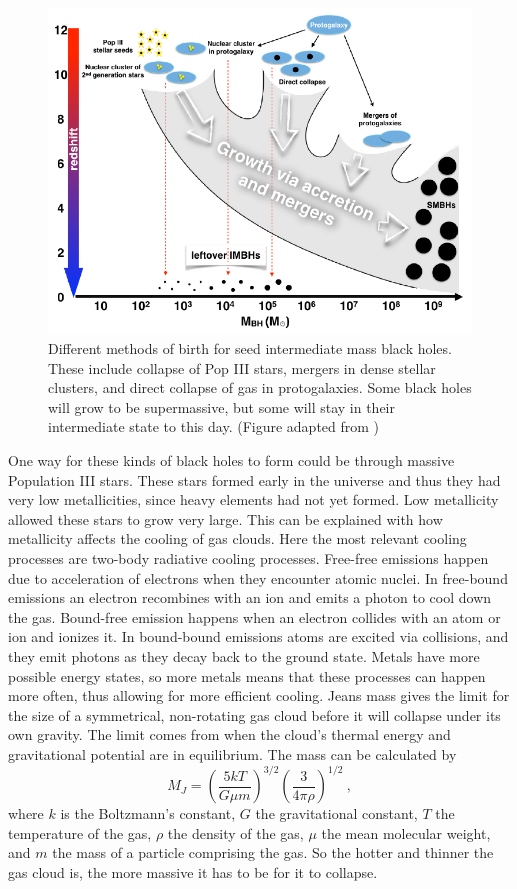\documentclass[english, oneside]{HYgradu}
\begin{document}
\begin{figure}[h!tb]
\centering
\includegraphics[width=\textwidth]{../images/imbhs.pdf}
\caption{Different methods of birth for seed intermediate mass black holes. These include collapse of Pop III stars, mergers in dense stellar clusters, and direct collapse of gas in protogalaxies. Some black holes will grow to be supermassive, but some will stay in their intermediate state to this day.
(Figure adapted from \citealt{mezcua:2017})}
\label{fig:imbhs}
\end{figure}

One way for these kinds of black holes to form could be through massive Population III stars. These stars formed early in the universe and thus they had very low metallicities, since heavy elements had not yet formed. Low metallicity allowed these stars to grow very large. This can be explained with how metallicity affects the cooling of gas clouds. 
Here the most relevant cooling processes are two-body radiative cooling processes. Free-free emissions happen due to acceleration of electrons when they encounter atomic nuclei. In free-bound emissions an electron recombines with an ion and emits a photon to cool down the gas. Bound-free emission happens when an electron collides with an atom or ion and ionizes it. In bound-bound emissions atoms are excited via collisions, and they emit photons as they decay back to the ground state. Metals have more possible energy states, so more metals means that these processes can happen more often, thus allowing for more efficient cooling.
Jeans mass gives the limit for the size of a symmetrical, non-rotating gas cloud before it will collapse under its own gravity. The limit comes from when the cloud's thermal energy and gravitational potential are in equilibrium. The mass can be calculated by
\begin{equation}
M_J = \left( \frac{5 k T}{G \mu m} \right)^{3/2} \left( \frac{3}{4 \pi \rho} \right)^{1/2} \ ,
\end{equation}
where $k$ is the Boltzmann's constant, $G$ the gravitational constant, $T$ the temperature of the gas, $\rho$ the density of the gas, $\mu$ the mean molecular weight, and $m$ the mass of a particle comprising the gas. So the hotter and thinner the gas cloud is, the more massive it has to be for it to collapse. 
\end{document}
